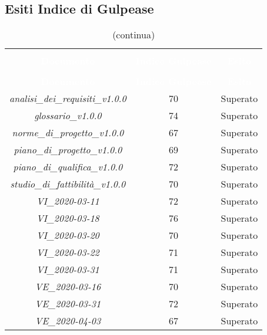 \subsection{Esiti Indice di Gulpease}
\begin{longtable}{c c c}
\rowcolor{white}\caption{Esiti verifica documenti con Indice di Gulpease} \\
		\rowcolor{redafk}
\textcolor{white}{\textbf{Documento}} &
\textcolor{white}{\textbf{Indice Gulpease}} &
\textcolor{white}{\textbf{Esito}} \\
		\endfirsthead
		\rowcolor{white}\caption[]{(continua)} \\
		\rowcolor{redafk}
\textcolor{white}{\textbf{Documento}} &
\textcolor{white}{\textbf{Indice Gulpease}} &
\textcolor{white}{\textbf{Esito}} \\
		\endhead
		\textit{analisi\_dei\_requisiti\_v1.0.0} & 70 & Superato \\
		\textit{glossario\_v1.0.0} & 74 & Superato \\
		\textit{norme\_di\_progetto\_v1.0.0} & 67 & Superato \\
		\textit{piano\_di\_progetto\_v1.0.0} & 69 & Superato \\
		\textit{piano\_di\_qualifica\_v1.0.0} & 72 & Superato \\
		\textit{studio\_di\_fattibilità\_v1.0.0} & 70 & Superato \\
		\textit{VI\_2020-03-11} & 72 & Superato \\
		\textit{VI\_2020-03-18} & 76 & Superato \\
		\textit{VI\_2020-03-20} & 70 & Superato \\
		\textit{VI\_2020-03-22} & 71 & Superato \\
		\textit{VI\_2020-03-31} & 71 & Superato \\
		\textit{VE\_2020-03-16} & 70 & Superato \\
		\textit{VE\_2020-03-31} & 72 & Superato \\
		\textit{VE\_2020-04-03} & 67 & Superato \\
\end{longtable}
